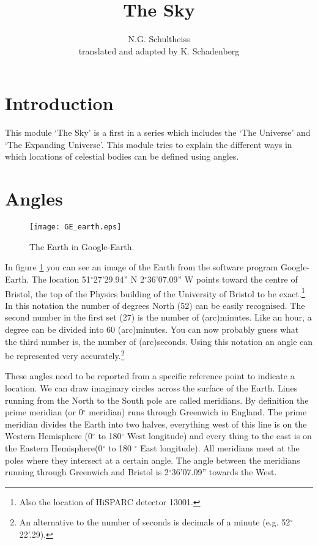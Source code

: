 


\author{N.G. Schultheiss \\ translated and adapted by K. Schadenberg}
\date{}
\title{The Sky}



\maketitle

\section{Introduction}
This module `The Sky' is a first in a series which includes the `The Universe' and `The Expanding Universe'. This module tries to explain the different ways in which locations of celestial bodies can be defined using angles.

\section{Angles}
\begin{figure}\begin{center}
\texttt{[image: GE\_earth.eps]}
\caption{The Earth in Google-Earth.}\label{fig:GE_earth}
\end{center}\end{figure} 

In figure \ref{fig:GE_earth} you can see an image of the Earth from the software program Google-Earth. The location 51$^{\circ}$27'29.94'' N 2$^{\circ}$36'07.09'' W points toward the centre of Bristol, the top of the Physics building of the University of Bristol to be exact.\footnote{Also the location of HiSPARC detector 13001.} In this notation the number of degrees North (52) can be easily recognised. The second number in the first set (27) is the number of (arc)minutes. Like an hour, a degree can be divided into 60 (arc)minutes. You can now probably guess what the third number is, the number of (arc)seconds. Using this notation an angle can be represented very accurately.\footnote{An alternative to the number of seconds is decimals of a minute (e.g. 52$^{\circ}$22'.29).}

These angles need to be reported from a specific reference point to indicate a location. We can draw imaginary circles across the surface of the Earth. Lines running from the North to the South pole are called meridians. By definition the prime meridian (or 0$^{\circ}$ meridian) runs through Greenwich in England. The prime meridian divides the Earth into two halves, everything west of this line is on the Western Hemisphere (0$^{\circ}$ to 180$^{\circ}$ West longitude) and every thing to the east is on the Eastern Hemisphere(0$^{\circ}$ to 180 $^{\circ}$ East longitude). All meridians meet at the poles where they intersect at a certain angle. The angle between the meridians running through Greenwich and Bristol is 2$^{\circ}$36'07.09'' towards the West.

